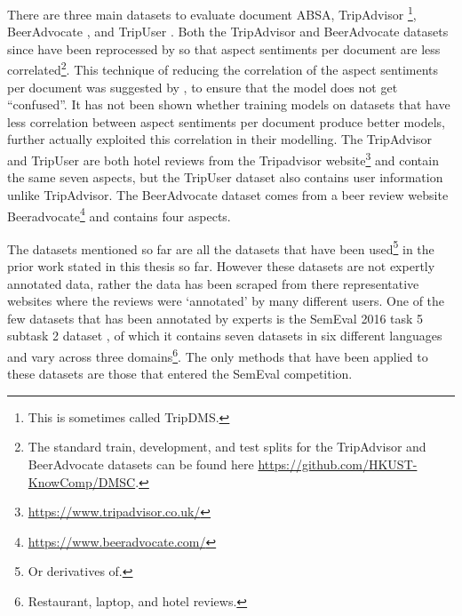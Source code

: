 There are three main datasets to evaluate document ABSA, TripAdvisor \citep{Wang2010LatentAR}\footnote{This is sometimes called TripDMS.}, BeerAdvocate \citep{mcauley2012learning}, and TripUser \citep{li-etal-2018-document}. Both the TripAdvisor and BeerAdvocate datasets since have been reprocessed by \citet{yin-etal-2017-document} so that aspect sentiments per document are less correlated\footnote{The standard train, development, and test splits for the TripAdvisor and BeerAdvocate datasets can be found here \url{https://github.com/HKUST-KnowComp/DMSC}.}. This technique of reducing the correlation of the aspect sentiments per document was suggested by \citet{lei-etal-2016-rationalizing}, to ensure that the model does not get ``confused''. It has not been shown whether training models on datasets that have less correlation between aspect sentiments per document produce better models, further \citet{snyder-barzilay-2007-multiple} actually exploited this correlation in their modelling. The TripAdvisor and TripUser are both hotel reviews from the Tripadvisor website\footnote{\url{https://www.tripadvisor.co.uk/}} and contain the same seven aspects, but the TripUser dataset also contains user information unlike TripAdvisor. The BeerAdvocate dataset comes from a beer review website Beeradvocate\footnote{\url{https://www.beeradvocate.com/}} and contains four aspects.

The datasets mentioned so far are all the datasets that have been used\footnote{Or derivatives of.} in the prior work stated in this thesis so far. However these datasets are not expertly annotated data, rather the data has been scraped from there representative websites where the reviews were `annotated' by many different users. One of the few datasets that has been annotated by experts is the SemEval 2016 task 5 subtask 2 dataset \citep{pontiki-etal-2016-semeval}, of which it contains seven datasets in six different languages and vary across three domains\footnote{Restaurant, laptop, and hotel reviews.}. The only methods that have been applied to these datasets are those that entered the SemEval competition.\\

